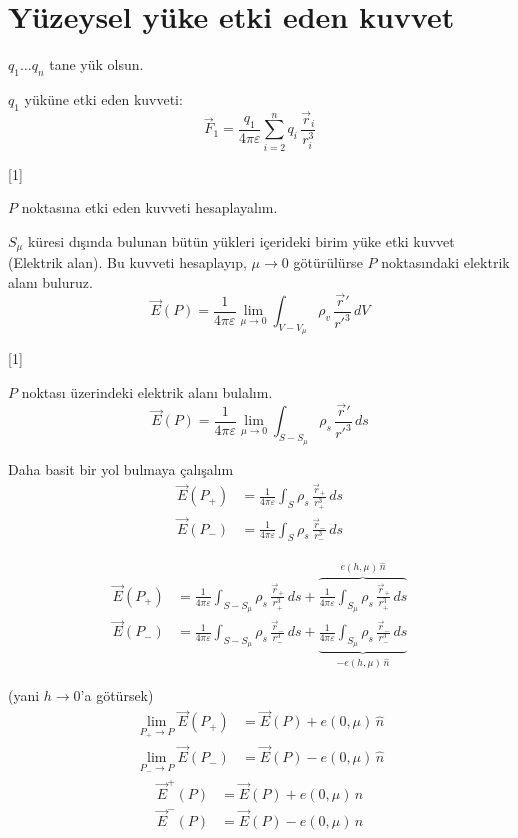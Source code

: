 \documentclass[11pt,a4paper]{article}
\begin{document}

\section{Yüzeysel yüke etki eden kuvvet}

$q_1 \ldots q_n$ tane yük olsun.

$q_1$ yüküne etki eden kuvveti:
\[ \vec F_1 = \frac{q_1}{4\pi\varepsilon}\sum_{i=2}^{n} q_i\,\frac{\vec r_i}{r_i^{3}} \]

[1]

$P$ noktasına etki eden kuvveti hesaplayalım.

$S_\mu$ küresi dışında bulunan bütün yükleri içerideki birim yüke etki kuvvet (Elektrik alan). Bu kuvveti hesaplayıp, $\mu\to 0$ götürülürse $P$ noktasındaki elektrik alanı buluruz.
\[ \vec E(P) = \frac{1}{4\pi\varepsilon}\lim_{\mu\to 0}\int_{V-V_\mu} \rho_v\,\frac{\vec r'}{r'^{3}}\,dV \]

[1]

$P$ noktası üzerindeki elektrik alanı bulalım.
\[ \vec E(P) = \frac{1}{4\pi\varepsilon}\lim_{\mu\to 0}\int_{S-S_\mu} \rho_s\,\frac{\vec r'}{r'^{3}}\,ds \]

Daha basit bir yol bulmaya çalışalım
\begin{align*}
\vec E(P_+) &= \frac{1}{4\pi\varepsilon}\int_S \rho_s\,\frac{\vec r_+}{r_+^{3}}\,ds \\
\vec E(P_-) &= \frac{1}{4\pi\varepsilon}\int_S \rho_s\,\frac{\vec r_-}{r_-^{3}}\,ds
\end{align*}

\begin{align*}
\vec E(P_+) &= \frac{1}{4\pi\varepsilon}\int_{S-S_\mu}\rho_s\,\frac{\vec r_+}{r_+^{3}}\,ds
  + \overbrace{\frac{1}{4\pi\varepsilon}\int_{S_\mu}\rho_s\,\frac{\vec r_+}{r_+^{3}}\,ds}^{e(h,\mu)\,\hat n} \\[4mm]
\vec E(P_-) &= \frac{1}{4\pi\varepsilon}\int_{S-S_\mu}\rho_s\,\frac{\vec r_-}{r_-^{3}}\,ds
  + \underbrace{\frac{1}{4\pi\varepsilon}\int_{S_\mu}\rho_s\,\frac{\vec r_-}{r_-^{3}}\,ds}_{-e(h,\mu)\,\hat n}
\end{align*}

(yani $h\to 0$'a götürsek)
\begin{align*}
\lim_{P_+\to P}\vec E(P_+) &= \vec E(P) + e(0,\mu)\,\hat n \\
\lim_{P_-\to P}\vec E(P_-) &= \vec E(P) - e(0,\mu)\,\hat n
\end{align*}
\begin{align*}
\vec E^{+}(P) &= \vec E(P) + e(0,\mu)\,\hat n \\
\vec E^{-}(P) &= \vec E(P) - e(0,\mu)\,\hat n
\end{align*}
\end{document}
